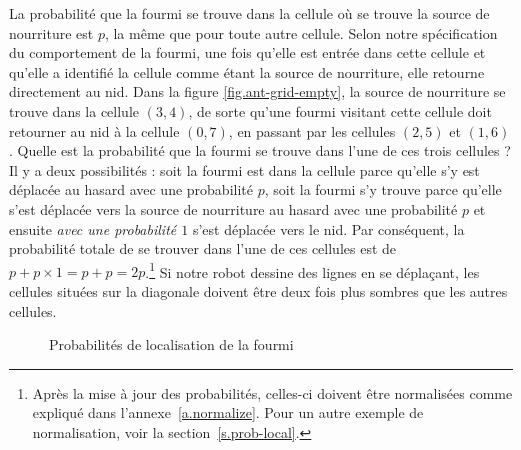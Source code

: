 La probabilité que la fourmi se trouve dans la cellule où se trouve la source de nourriture est $p$, la même que pour toute autre cellule. Selon notre spécification du comportement de la fourmi, une fois qu'elle est entrée dans cette cellule et qu'elle a identifié la cellule comme étant la source de nourriture, elle retourne directement au nid. Dans la figure \ref{fig.ant-grid-empty}, la source de nourriture se trouve dans la cellule $(3,4)$, de sorte qu'une fourmi visitant cette cellule doit retourner au nid à la cellule $(0,7)$, en passant par les cellules $(2,5)$ et $(1,6)$. Quelle est la probabilité que la fourmi se trouve dans l'une de ces trois cellules ? Il y a deux possibilités : soit la fourmi est dans la cellule parce qu'elle s'y est déplacée au hasard avec une probabilité $p$, soit la fourmi s'y trouve parce qu'elle s'est déplacée vers la source de nourriture au hasard avec une probabilité $p$ et ensuite \emph{avec une probabilité $1$} s'est déplacée vers le nid. Par conséquent, la probabilité totale de se trouver dans l'une de ces cellules est de $p+p\times 1=p+p=2p$.\footnote{Après la mise à jour des probabilités, celles-ci doivent être normalisées comme expliqué dans l'annexe~\ref{a.normalize}. Pour un autre exemple de normalisation, voir la section~\ref{s.prob-local}.}  Si notre robot dessine des lignes en se déplaçant, les cellules situées sur la diagonale doivent être deux fois plus sombres que les autres cellules.

\begin{figure}
\begin{center}
\end{center}
\caption{Probabilités de localisation de la fourmi}\label{fig.ant-grid-prob}
\end{figure}

